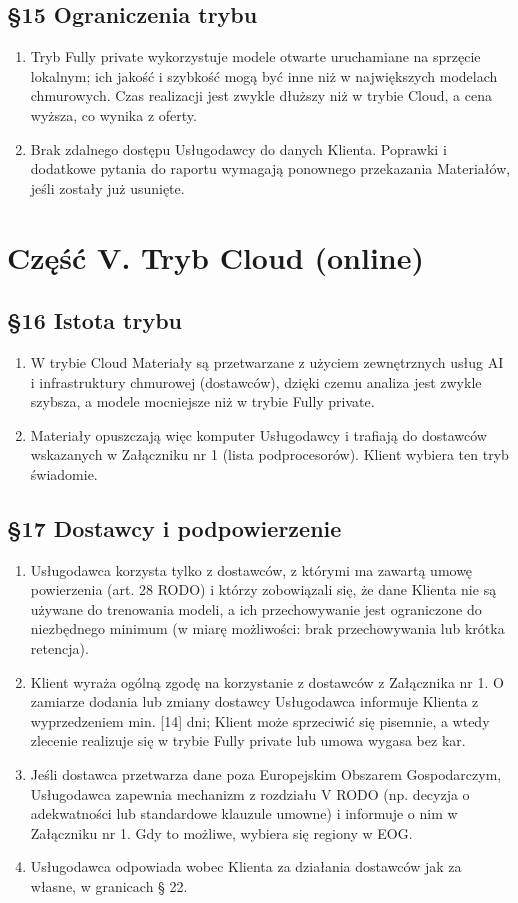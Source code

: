 \documentclass[11pt,a4paper]{article}
\begin{document}
\subsection*{§15 Ograniczenia trybu}
\begin{enumerate}
\item Tryb Fully private wykorzystuje modele otwarte uruchamiane na sprzęcie lokalnym; ich jakość i szybkość mogą być inne niż w największych modelach chmurowych. Czas realizacji jest zwykle dłuższy niż w trybie Cloud, a cena wyższa, co wynika z oferty.
\item Brak zdalnego dostępu Usługodawcy do danych Klienta. Poprawki i dodatkowe pytania do raportu wymagają ponownego przekazania Materiałów, jeśli zostały już usunięte.
\end{enumerate}

\section*{Część V. Tryb Cloud (online)}

\subsection*{§16 Istota trybu}
\begin{enumerate}
\item W trybie Cloud Materiały są przetwarzane z użyciem zewnętrznych usług AI i infrastruktury chmurowej (dostawców), dzięki czemu analiza jest zwykle szybsza, a modele mocniejsze niż w trybie Fully private.
\item Materiały opuszczają więc komputer Usługodawcy i trafiają do dostawców wskazanych w Załączniku nr 1 (lista podprocesorów). Klient wybiera ten tryb świadomie.
\end{enumerate}

\subsection*{§17 Dostawcy i podpowierzenie}
\begin{enumerate}
\item Usługodawca korzysta tylko z dostawców, z którymi ma zawartą umowę powierzenia (art. 28 RODO) i którzy zobowiązali się, że dane Klienta nie są używane do trenowania modeli, a ich przechowywanie jest ograniczone do niezbędnego minimum (w miarę możliwości: brak przechowywania lub krótka retencja).
\item Klient wyraża ogólną zgodę na korzystanie z dostawców z Załącznika nr 1. O zamiarze dodania lub zmiany dostawcy Usługodawca informuje Klienta z wyprzedzeniem min. [14] dni; Klient może sprzeciwić się pisemnie, a wtedy zlecenie realizuje się w trybie Fully private lub umowa wygasa bez kar.
\item Jeśli dostawca przetwarza dane poza Europejskim Obszarem Gospodarczym, Usługodawca zapewnia mechanizm z rozdziału V RODO (np. decyzja o adekwatności lub standardowe klauzule umowne) i informuje o nim w Załączniku nr 1. Gdy to możliwe, wybiera się regiony w EOG.
\item Usługodawca odpowiada wobec Klienta za działania dostawców jak za własne, w granicach § 22.
\end{enumerate}
\end{document}
